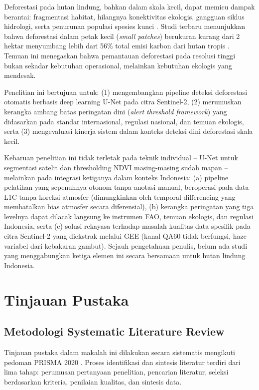 \documentclass[12pt,a4paper]{article}
\begin{document}
Deforestasi pada hutan lindung, bahkan dalam skala kecil, dapat memicu dampak
berantai: fragmentasi habitat, hilangnya konektivitas ekologis, gangguan siklus
hidrologi, serta penurunan populasi spesies kunci \cite{taubert2018fragmentation}.
Studi terbaru menunjukkan bahwa deforestasi dalam petak kecil (\textit{small patches})
berukuran kurang dari 2 hektar menyumbang lebih dari 56\% total emisi karbon dari
hutan tropis \cite{xu2026nature}. Temuan ini menegaskan bahwa pemantauan deforestasi
pada resolusi tinggi bukan sekadar kebutuhan operasional, melainkan kebutuhan
ekologis yang mendesak.

Penelitian ini bertujuan untuk: (1) mengembangkan pipeline deteksi deforestasi
otomatis berbasis deep learning U-Net pada citra Sentinel-2, (2) merumuskan kerangka
ambang batas peringatan dini (\textit{alert threshold framework}) yang didasarkan
pada standar internasional, regulasi nasional, dan temuan ekologis, serta
(3) mengevaluasi kinerja sistem dalam konteks deteksi dini deforestasi skala kecil.

Kebaruan penelitian ini tidak terletak pada teknik individual -- U-Net untuk
segmentasi satelit dan thresholding NDVI masing-masing sudah mapan -- melainkan
pada integrasi ketiganya dalam konteks Indonesia: (a) pipeline pelatihan yang
sepenuhnya otonom tanpa anotasi manual, beroperasi pada data L1C tanpa koreksi
atmosfer (dimungkinkan oleh temporal differencing yang membatalkan bias atmosfer
secara diferensial), (b) kerangka peringatan yang tiga levelnya dapat dilacak
langsung ke instrumen FAO, temuan ekologis, dan regulasi Indonesia, serta
(c) solusi rekayasa terhadap masalah kualitas data spesifik pada citra Sentinel-2
yang diekstrak melalui GEE (kanal QA60 tidak berfungsi, haze variabel dari
kebakaran gambut). Sejauh pengetahuan penulis, belum ada studi yang menggabungkan
ketiga elemen ini secara bersamaan untuk hutan lindung Indonesia.

\section{Tinjauan Pustaka}
\label{sec:tinjauan}

\subsection{Metodologi Systematic Literature Review}
\label{subsec:slr}

Tinjauan pustaka dalam makalah ini dilakukan secara sistematis
mengikuti pedoman PRISMA 2020 \cite{page2021prisma}. Proses
identifikasi dan sintesis literatur terdiri dari lima tahap:
perumusan pertanyaan penelitian, pencarian literatur, seleksi
berdasarkan kriteria, penilaian kualitas, dan sintesis data.
\end{document}

